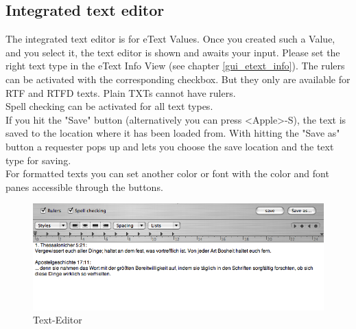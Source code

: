 \documentclass[12pt,a4]{article}
\begin{document}
\subsection{Integrated text editor}
\label{gui_texteditor}
\medskip
The integrated text editor is for eText Values. Once you created such a Value, and you select it, the text editor is shown and awaits your input. Please set the right text type in the eText Info View (see chapter \ref{gui_etext_info}). The rulers can be activated with the corresponding checkbox. But they only are available for RTF and RTFD texts. Plain TXTs cannot have rulers. \\
Spell checking can be activated for all text types. \\
If you hit the "Save" button (alternatively you can press <Apple>-S), the text is saved to the location where it has been loaded from. With hitting the "Save as" button a requester pops up and lets you choose the save location and the text type for saving. \\
For formatted texts you can set another color or font with the color and font panes accessible through the buttons.
% 
\begin{figure}[ht]
\begin{center}
\includegraphics[width=13.5cm]{images/Editor_View.png}
\end{center}
\caption{Text-Editor}
\label{image:texteditor}
\end{figure}
\noindent
%
\end{document}
